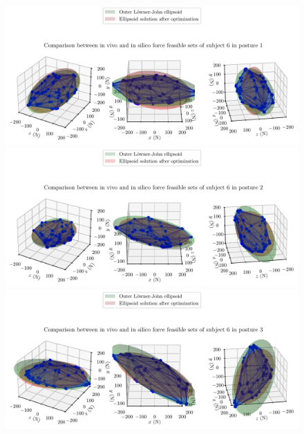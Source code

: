\clearpage
\begin{figure}[!htb]
    \centering
    \begin{minipage}{1\linewidth}
        \captionsetup{justification=centering}
        \centering
        \includegraphics[trim=0 0 0 60, clip, width=0.8\linewidth]{img/chapter_5/subject_251_solution_4_posture_1.pdf}
    \end{minipage}
    \hfill
    \begin{minipage}{1\linewidth}
        \captionsetup{justification=centering}
        \centering
        \includegraphics[trim=0 0 0 60, clip, width=0.8\linewidth]{img/chapter_5/subject_251_solution_4_posture_2.pdf}
    \end{minipage}
    \begin{minipage}{1\linewidth}
        \captionsetup{justification=centering}
        \centering
        \includegraphics[trim=0 0 0 60, clip, width=0.8\linewidth]{img/chapter_5/subject_251_solution_4_posture_3.pdf}
    \end{minipage}
    \begin{minipage}{1\linewidth}

\end{minipage}
\end{figure}
